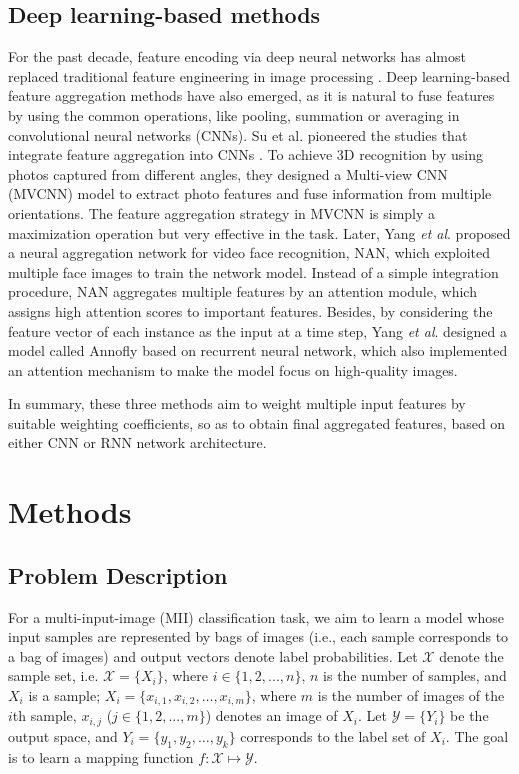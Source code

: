 \documentclass[10pt,twocolumn,letterpaper]{article}
\begin{document}
\subsection{Deep learning-based methods}
For the past decade, feature encoding via deep neural networks has almost replaced traditional feature engineering in image processing \cite{ref16, ref19, ref20}. Deep learning-based feature aggregation methods have also emerged, as it is natural to fuse features by using the common operations, like pooling, summation or averaging in convolutional neural networks (CNNs). Su et al. pioneered the studies that integrate feature aggregation into CNNs \cite{ref23}. To achieve 3D recognition by using photos captured from different angles, they designed a Multi-view CNN (MVCNN) model \cite{ref23} to extract photo features and fuse information from multiple orientations. The feature aggregation strategy in MVCNN is simply a maximization operation but very effective in the task. Later, Yang \emph{et al}. proposed a neural aggregation network for video face recognition, NAN\cite{ref24}, which exploited multiple face images to train the network model. Instead of a simple integration procedure, NAN aggregates multiple features by an attention module, which assigns high attention scores to important features.
Besides, by considering the feature vector of each instance as the input at a time step, Yang \emph{et al}. designed a model called Annofly \cite{annofly} based on recurrent neural network, which also implemented an attention mechanism to make the model focus on high-quality images.

In summary, these three methods aim to weight multiple input features by suitable weighting coefficients, so as to obtain final aggregated features, based on either CNN or RNN network architecture. %


\section{Methods}
\subsection{Problem Description}


For a multi-input-image (MII) classification task, we aim to learn a model whose input samples are represented by bags of images (i.e., each sample corresponds to a bag of images) and output vectors denote label probabilities. Let $\mathcal{X}$ denote the sample set, i.e. $\mathcal{X}=\{X_i\}$, where $i \in \{1,2,...,n\}$, $n$ is the number of samples, and $X_i$ is a sample; $X_i=\{x_{i,1}, x_{i,2}, \ldots, x_{i,m}\}$, where $m$ is the number of images of the $i$th sample, $x_{i,j}$ ($j \in \{1, 2, ..., m\}$) denotes an image of $X_i$.
Let $\mathcal{Y}=\{Y_i\}$ be the output space, and $Y_i=\{y_1,y_2, \ldots, y_k\}$ corresponds to the label set of $X_i$. The goal is to learn a mapping function $f:\mathcal{X}\mapsto \mathcal{Y}$. 
\end{document}
